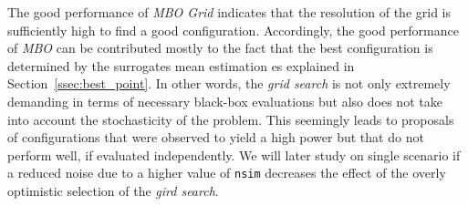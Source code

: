 \documentclass[bimj,fleqn]{w-art}
\theoremstyle{plain}
\theoremstyle{definition}
\begin{document}
The good performance of \emph{MBO Grid} indicates that the resolution of the grid is sufficiently high to find a good configuration.
Accordingly, the good performance of \emph{MBO} can be contributed mostly to the fact that the best configuration is determined by the surrogates mean estimation es explained in Section~\ref{ssec:best_point}.
In other words, the \emph{grid search} is not only extremely demanding in terms of necessary black-box evaluations but also does not take into account the stochasticity of the problem.
This seemingly leads to proposals of configurations that were observed to yield a high power but that do not perform well, if evaluated independently.
We will later study on single scenario if a reduced noise due to a higher value of \texttt{nsim} decreases the effect of the overly optimistic selection of the \emph{gird search}.
\end{document}
